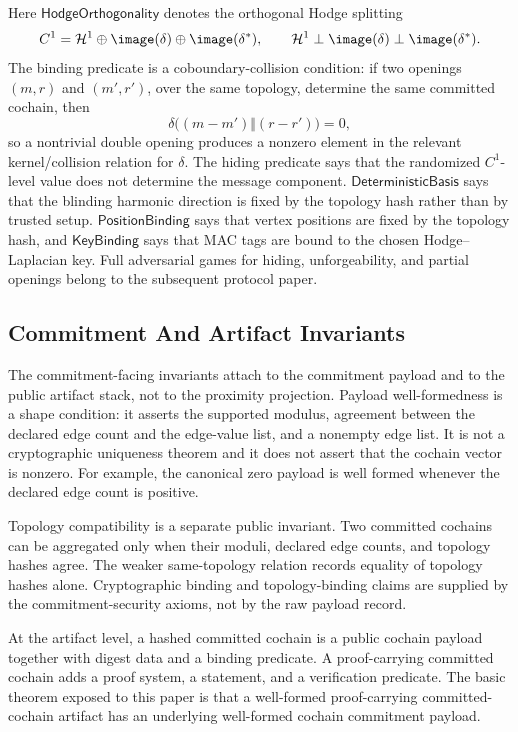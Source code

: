 Here \(\mathsf{HodgeOrthogonality}\) denotes the orthogonal Hodge splitting
\[
  C^1
  =
  \mathcal H^1\oplus\image(\delta)\oplus\image(\delta^\ast),
  \qquad
  \mathcal H^1\perp\image(\delta)\perp\image(\delta^\ast).
\]
The binding predicate is a coboundary-collision condition: if two openings
\((m,r)\) and \((m',r')\), over the same topology, determine the same committed
cochain, then
\[
  \delta\bigl((m-m')\Vert(r-r')\bigr)=0,
\]
so a nontrivial double opening produces a nonzero element in the relevant
kernel/collision relation for \(\delta\). The hiding predicate says that the
randomized \(C^1\)-level value does not determine the message component.
\(\mathsf{DeterministicBasis}\) says that the blinding harmonic direction is
fixed by the topology hash rather than by trusted setup.
\(\mathsf{PositionBinding}\) says that vertex positions are fixed by the
topology hash, and \(\mathsf{KeyBinding}\) says that MAC tags are bound to the
chosen Hodge--Laplacian key. Full adversarial games for hiding,
unforgeability, and partial openings belong to the subsequent protocol paper.

\subsection{Commitment And Artifact Invariants}

The commitment-facing invariants attach to the commitment payload and to the
public artifact stack, not to the proximity projection. Payload
well-formedness is a shape condition: it asserts the supported modulus,
agreement between the declared edge count and the edge-value list, and a
nonempty edge list. It is not a cryptographic uniqueness theorem and it does
not assert that the cochain vector is nonzero. For example, the canonical zero
payload is well formed whenever the declared edge count is positive.

Topology compatibility is a separate public invariant. Two committed cochains
can be aggregated only when their moduli, declared edge counts, and topology
hashes agree. The weaker same-topology relation records equality of topology
hashes alone. Cryptographic binding and topology-binding claims are supplied by
the commitment-security axioms, not by the raw payload record.

At the artifact level, a hashed committed cochain is a public cochain payload
together with digest data and a binding predicate. A proof-carrying committed
cochain adds a proof system, a statement, and a verification predicate. The
basic theorem exposed to this paper is that a well-formed proof-carrying
committed-cochain artifact has an underlying well-formed cochain commitment
payload.

